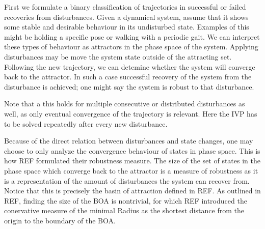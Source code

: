     First we formulate a binary classification of trajectories in successful or failed recoveries from disturbances. %
    Given a dynamical system, assume that it shows some stable and desirable behaviour in its undisturbed state. Examples of this might be holding a specific pose or walking with a periodic gait. We can interpret these types of behaviour as attractors in the phase space of the system. Applying disturbances may be move the system state outside of the attracting set. Following the new trajectory, we can detemine whether the system will converge back to the attractor. In such a case successful recovery of the system from the disturbance is achieved; one might say the system is robust to that disturbance. %





    Note that a this holds for multiple consecutive or distributed disturbances as well, as only eventual convergence of the trajectory is relevant. Here the IVP has to be solved repeatedly after every new disturbance. %






    Because of the direct relation between disturbances and state changes, one may choose to only analyze the convergence behaviour of states in phase space. This is how REF formulated their robustness measure. The size of the set of states in the phase space which converge back to the attractor is a measure of robustness as it is a representation of the amount of disturbances the system can recover from. Notice that this is precisely the basin of attraction defined in REF. As outlined in REF, finding the size of the BOA is nontrivial, for which REF introduced the conervative measure of the minimal Radius as the shortest distance from the origin to the boundary of the BOA.

